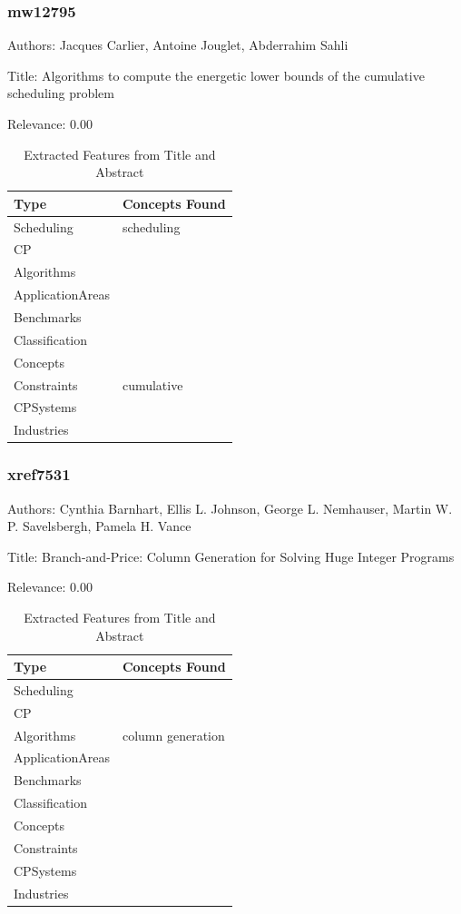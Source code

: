 \subsubsection{mw12795}
\label{mw:mw12795}

Authors: Jacques Carlier, Antoine Jouglet, Abderrahim Sahli

Title: Algorithms to compute the energetic lower bounds of the cumulative scheduling problem

Relevance:  0.00

{\scriptsize
\begin{longtable}{p{2cm}p{20cm}}
\caption{Extracted Features from Title and Abstract}\\ \toprule
Type & Concepts Found\\ \midrule
\endhead
\bottomrule
\endfoot
Scheduling & scheduling\\ 
CP & \\ 
Algorithms & \\ 
ApplicationAreas & \\ 
Benchmarks & \\ 
Classification & \\ 
Concepts & \\ 
Constraints & cumulative\\ 
CPSystems & \\ 
Industries & \\ 
\end{longtable}
}



\subsubsection{xref7531}
\label{mw:xref7531}

Authors: Cynthia Barnhart, Ellis L. Johnson, George L. Nemhauser, Martin W. P. Savelsbergh, Pamela H. Vance

Title: Branch-and-Price: Column Generation for Solving Huge Integer Programs

Relevance:  0.00

{\scriptsize
\begin{longtable}{p{2cm}p{20cm}}
\caption{Extracted Features from Title and Abstract}\\ \toprule
Type & Concepts Found\\ \midrule
\endhead
\bottomrule
\endfoot
Scheduling & \\ 
CP & \\ 
Algorithms & column generation\\ 
ApplicationAreas & \\ 
Benchmarks & \\ 
Classification & \\ 
Concepts & \\ 
Constraints & \\ 
CPSystems & \\ 
Industries & \\ 
\end{longtable}
}

